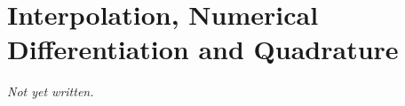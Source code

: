 \chapter{Interpolation, Numerical Differentiation and Quadrature}\label{ch:interpolation-quadrature}


\textit{Not yet written.}
